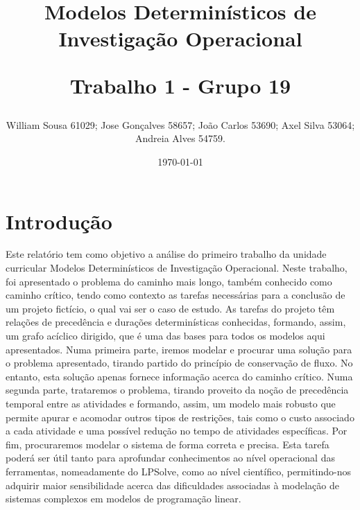 \documentclass[11pt,titlepage,contentspage,a4paper]{article} %
\newcommand\BackgroundPic[3]{
\put(#2,#3){\parbox[b][\paperheight]{\paperwidth}{
\vfill
\centering
\texttt{[image: \#1]}
\vfill
}}}
\begin{document}
\AddToShipoutPicture*{\BackgroundPic{logo_eeng.jpg}{-230}{360}}




\title{Modelos Determinísticos de Investigação Operacional \\ 
\begin{large} 
	Trabalho 1 - Grupo 19 
\end{large}}
\author{\begin{small}
William Sousa 61029; Jose Gonçalves 58657; João Carlos 53690; Axel Silva 53064; Andreia Alves 54759.\end{small}}
\date{\today}



\maketitle

\tableofcontents %

\newpage

\section{Introdução}
Este relatório tem como objetivo a análise do primeiro trabalho da unidade curricular  Modelos Determinísticos de Investigação Operacional.
Neste trabalho, foi apresentado o problema do caminho mais longo, também conhecido como caminho crítico, tendo como contexto as tarefas necessárias para a conclusão de um projeto fictício, o qual vai ser o caso de estudo. As tarefas do projeto têm relações de precedência e durações determinísticas conhecidas, formando, assim, um grafo acíclico dirigido, que é uma das bases para todos os modelos aqui apresentados.
Numa primeira parte, iremos modelar e procurar uma solução para o problema apresentado, tirando partido do princípio de conservação de fluxo. No entanto, esta solução apenas fornece informação acerca do caminho crítico.
Numa segunda parte, trataremos o problema, tirando proveito da noção de precedência temporal entre as atividades e formando, assim, um modelo mais robusto que permite apurar e acomodar outros tipos de restrições, tais como o custo associado a cada atividade e uma possível redução no tempo de atividades específicas.
Por fim, procuraremos modelar o sistema de forma correta e precisa. Esta tarefa poderá ser útil tanto para aprofundar conhecimentos ao nível operacional das ferramentas, nomeadamente do LPSolve, como ao nível científico, permitindo-nos adquirir maior sensibilidade acerca das dificuldades associadas à modelação de sistemas complexos em modelos de programação linear.
\end{document}
